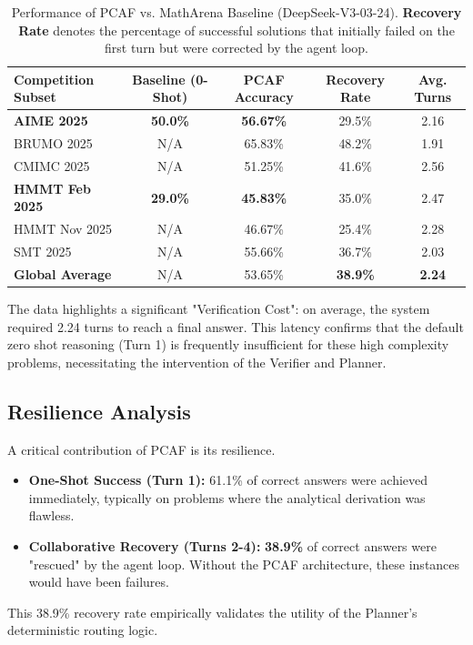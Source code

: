 \documentclass{article}
\begin{document}
\begin{table}[h]
  \caption{Performance of PCAF vs. MathArena Baseline (DeepSeek-V3-03-24). 
  \textbf{Recovery Rate} denotes the percentage of successful solutions that initially failed on the first turn but were corrected by the agent loop.}
  \label{tab:pcaf_results}
  \centering
  \begin{tabular}{lcccc}
    \toprule
    \textbf{Competition Subset} & \textbf{Baseline (0-Shot)} & \textbf{PCAF Accuracy} & \textbf{Recovery Rate} & \textbf{Avg. Turns} \\
    \midrule
    \textbf{AIME 2025}               & \textbf{50.0\%}  & \textbf{56.67\%} & 29.5\% & 2.16 \\
    BRUMO 2025              & N/A     & 65.83\% & 48.2\% & 1.91 \\
    CMIMC 2025              & N/A     & 51.25\% & 41.6\% & 2.56 \\
    \textbf{HMMT Feb 2025}           & \textbf{29.0\%}  & \textbf{45.83\%} & 35.0\% & 2.47 \\
    HMMT Nov 2025           & N/A     & 46.67\% & 25.4\% & 2.28 \\
    SMT 2025                & N/A     & 55.66\% & 36.7\% & 2.03 \\
    \midrule
    \textbf{Global Average} & {N/A} & {53.65\%} & \textbf{38.9\%} & \textbf{2.24} \\
    \bottomrule
  \end{tabular}
\end{table}

The data highlights a significant "Verification Cost": on average, the system required 2.24 turns to reach a final answer. This latency confirms that the default zero shot reasoning (Turn 1) is frequently insufficient for these high complexity problems, necessitating the intervention of the Verifier and Planner.

\subsection{Resilience Analysis}
A critical contribution of PCAF is its resilience.
\begin{itemize}
    \item \textbf{One-Shot Success (Turn 1):} 61.1\% of correct answers were achieved immediately, typically on problems where the analytical derivation was flawless.
    \item \textbf{Collaborative Recovery (Turns 2-4):} \textbf{38.9\%} of correct answers were "rescued" by the agent loop. Without the PCAF architecture, these instances would have been failures.
\end{itemize}
This 38.9\% recovery rate empirically validates the utility of the Planner's deterministic routing logic.
\end{document}
